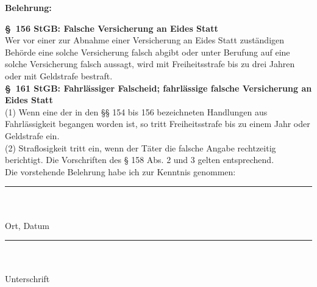 \vfill
\noindent
\textbf{Belehrung:}

\vspace{4mm}
\vfil
\noindent
\textbf{\S~156 StGB: Falsche Versicherung an Eides Statt}\\
Wer vor einer zur Abnahme einer Versicherung an Eides Statt zuständigen Behörde eine solche Versicherung
falsch abgibt oder unter Berufung auf eine solche Versicherung falsch aussagt, wird mit Freiheitsstrafe bis zu drei
Jahren oder mit Geldstrafe bestraft.\\


\noindent
\textbf{\S~161 StGB: Fahrlässiger Falscheid; fahrlässige falsche Versicherung an Eides Statt}\\
(1) Wenn eine der in den §§ 154 bis 156 bezeichneten Handlungen aus Fahrlässigkeit begangen worden ist, so
tritt Freiheitsstrafe bis zu einem Jahr oder Geldstrafe ein.\\
(2) Straflosigkeit tritt ein, wenn der Täter die falsche Angabe rechtzeitig berichtigt. Die Vorschriften des § 158
Abs. 2 und 3 gelten entsprechend.\\


\noindent
\normalsize Die vorstehende Belehrung habe ich zur Kenntnis genommen:\\
\vspace{4mm}
\vfil

\begin{spacing}{0.4}
	\noindent 
	\begin{minipage}[t]{0.41\textwidth}
		\rule{\textwidth}{0.4pt}\\\\
		Ort, Datum
	\end{minipage}
	\hfill
	\begin{minipage}[t]{0.41\textwidth}
		\rule{\textwidth}{0.4pt}\\\\
		Unterschrift
	\end{minipage}
\end{spacing}